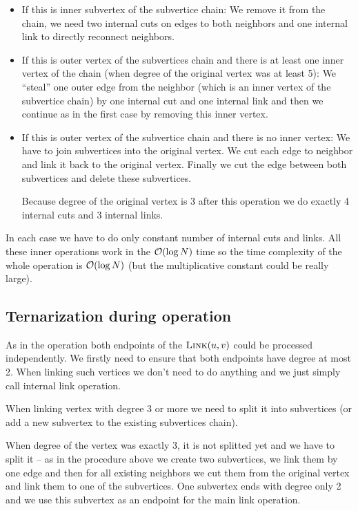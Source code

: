 \begin{itemize}
\item {\I If this is inner subvertex of the subvertice chain:} We remove it
from the chain, we need two internal cuts on edges to both neighbors and one
internal link to directly reconnect neighbors.

\item {\I If this is outer vertex of the subvertices chain and there is at least
one inner vertex of the chain (when degree of the original vertex was
at least 5):} We ``steal'' one outer edge from the neighbor (which is
an inner vertex of the subvertice chain) by one internal cut and one internal
link and then we continue as in the first case by removing this inner vertex.

\item {\I If this is outer vertex of the subvertice chain and there is no inner
vertex:} We have to join subvertices into the original vertex. We cut each edge
to neighbor and link it back to the original vertex. Finally we cut the edge
between both subvertices and delete these subvertices.

Because degree of the original vertex is 3 after this operation we do exactly
4 internal cuts and 3 internal links.
\end{itemize}

In each case we have to do only constant number of internal cuts and links. All
these inner operations work in the ${\cal O}(\log N)$ time so the time complexity of
the whole \Cut{} operation is ${\cal O}(\log N)$ (but the multiplicative constant could
be really large).

\subsection{Ternarization during \Link{} operation}

As in the \Cut{} operation both endpoints of the $\hbox{\sc Link}(u,v)$ could be processed
independently. We firstly need to ensure that both endpoints have degree at
most 2. When linking such vertices we don't need to do anything and we just simply
call internal link operation.

When linking vertex with degree 3 or more we need to split it into subvertices
(or add a new subvertex to the existing subvertices chain).

When degree of the vertex was exactly 3, it is not splitted yet and we have to
split it -- as in the procedure above we create two subvertices, we link them by
one edge and then for all existing neighbors we cut them from the original
vertex and link them to one of the subvertices. One subvertex ends with degree
only 2 and we use this subvertex as an endpoint for the main link operation.

